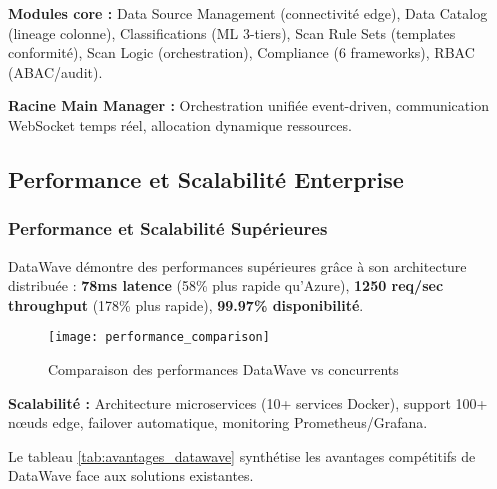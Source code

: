 \textbf{Modules core :} Data Source Management (connectivité edge), Data Catalog (lineage colonne), Classifications (ML 3-tiers), Scan Rule Sets (templates conformité), Scan Logic (orchestration), Compliance (6 frameworks), RBAC (ABAC/audit).

\textbf{Racine Main Manager :} Orchestration unifiée event-driven, communication WebSocket temps réel, allocation dynamique ressources.

\subsection{Performance et Scalabilité Enterprise}

\subsubsection{Performance et Scalabilité Supérieures}

DataWave démontre des performances supérieures grâce à son architecture distribuée : \textbf{78ms latence} (58\% plus rapide qu'Azure), \textbf{1250 req/sec throughput} (178\% plus rapide), \textbf{99.97\% disponibilité}.

\begin{figure}[htpb]
\centering
\texttt{[image: performance\_comparison]}
\caption{Comparaison des performances DataWave vs concurrents}
\label{fig:performance_comparison}
\end{figure}

\textbf{Scalabilité :} Architecture microservices (10+ services Docker), support 100+ nœuds edge, failover automatique, monitoring Prometheus/Grafana.

Le tableau \ref{tab:avantages_datawave} synthétise les avantages compétitifs de DataWave face aux solutions existantes.

